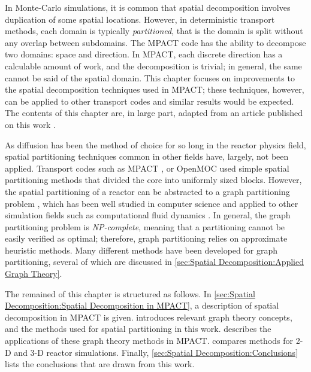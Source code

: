 {{    In Monte-Carlo simulations, it is common that spatial decomposition involves duplication of some spatial locations.
    However, in deterministic transport methods, each domain is typically \emph{partitioned}, that is the domain is split without any overlap between subdomains.
    The MPACT \cite{MPACT2016} code has the ability to decompose two domains: space and direction.
    In MPACT, each discrete direction has a calculable amount of work, and the decomposition is trivial; in general, the same cannot be said of the spatial domain.
    This chapter focuses on improvements to the spatial decomposition techniques used in MPACT; these techniques, however, can be applied to other transport codes and similar results would be expected.
    The contents of this chapter are, in large part, adapted from an article published on this work \cite{Fitzgerald2019a}.

    As diffusion has been the method of choice for so long in the reactor physics field, spatial partitioning techniques common in other fields have, largely, not been applied.
    Transport codes such as MPACT \cite{MPACT2016}, or OpenMOC \cite{Gunow2018} used simple spatial partitioning methods that divided the core into uniformly sized blocks.
    However, the spatial partitioning of a reactor can be abstracted to a graph partitioning problem \cite{Fitzgerald2017}, which has been well studied in computer science \cite{Elsner1997} and applied to other simulation fields such as computational fluid dynamics \cite{Yao1998}.
    In general, the graph partitioning problem is \emph{NP-complete}, meaning that a partitioning cannot be easily verified as optimal; therefore, graph partitioning relies on approximate heuristic methods.
    Many different methods have been developed for graph partitioning, several of which are discussed in \cref{sec:Spatial Decomposition:Applied Graph Theory}.

    The remained of this chapter is structured as follows.
    In \cref{sec:Spatial Decomposition:Spatial Decomposition in MPACT}, a description of spatial decomposition in MPACT is given.
     introduces relevant graph theory concepts, and the methods used for spatial partitioning in this work.
     describes the applications of these graph theory methods in MPACT.
     compares methods for 2-D and 3-D reactor simulations.
    Finally, \cref{sec:Spatial Decomposition:Conclusions} lists the conclusions that are drawn from this work.
  }
}
